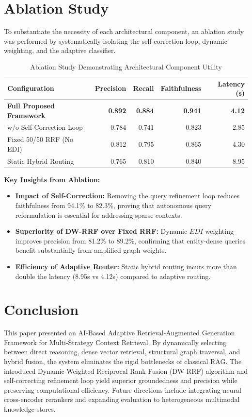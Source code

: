 \documentclass[conference]{IEEEtran}
\begin{document}
\section{Ablation Study}
To substantiate the necessity of each architectural component, an ablation study was performed by systematically isolating the self-correction loop, dynamic weighting, and the adaptive classifier.

\begin{table}[htbp]
\centering
\caption{Ablation Study Demonstrating Architectural Component Utility}
\label{tab:rag_ablation}
\begin{tabular}{lrrrr}
\toprule
Configuration & Precision & Recall & Faithfulness & Latency (s) \\
\midrule
\textbf{Full Proposed Framework} & \textbf{0.892} & \textbf{0.884} & \textbf{0.941} & \textbf{4.12} \\
w/o Self-Correction Loop & 0.784 & 0.741 & 0.823 & 2.85 \\
Fixed 50/50 RRF (No EDI) & 0.812 & 0.795 & 0.865 & 4.30 \\
Static Hybrid Routing & 0.765 & 0.810 & 0.840 & 8.95 \\
\bottomrule
\end{tabular}
\end{table}

\textbf{Key Insights from Ablation:}
\begin{itemize}
    \item \textbf{Impact of Self-Correction:} Removing the query refinement loop reduces faithfulness from 94.1\% to 82.3\%, proving that autonomous query reformulation is essential for addressing sparse contexts.
    \item \textbf{Superiority of DW-RRF over Fixed RRF:} Dynamic $EDI$ weighting improves precision from 81.2\% to 89.2\%, confirming that entity-dense queries benefit substantially from amplified graph weights.
    \item \textbf{Efficiency of Adaptive Router:} Static hybrid routing incurs more than double the latency (8.95s vs 4.12s) compared to adaptive routing.
\end{itemize}

\section{Conclusion}
This paper presented an AI-Based Adaptive Retrieval-Augmented Generation Framework for Multi-Strategy Context Retrieval. By dynamically selecting between direct reasoning, dense vector retrieval, structural graph traversal, and hybrid fusion, the system eliminates the rigid bottlenecks of classical RAG. The introduced Dynamic-Weighted Reciprocal Rank Fusion (DW-RRF) algorithm and self-correcting refinement loop yield superior groundedness and precision while preserving computational efficiency. Future directions include integrating neural cross-encoder rerankers and expanding evaluation to heterogeneous multimodal knowledge stores.



\end{document}
